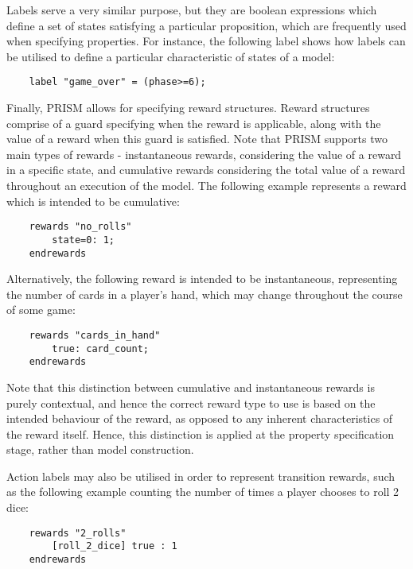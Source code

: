 Labels serve a very similar purpose, but they are boolean expressions which define a set of states satisfying a particular proposition, which are frequently used when specifying properties. For instance, the following label shows how labels can be utilised to define a particular characteristic of states of a model:

\begin{verbatim}
    label "game_over" = (phase>=6);
\end{verbatim}




Finally, PRISM allows for specifying reward structures. Reward structures comprise of a guard specifying when the reward is applicable, along with the value of a reward when this guard is satisfied. Note that PRISM supports two main types of rewards - instantaneous rewards, considering the value of a reward in a specific state, and cumulative rewards considering the total value of a reward throughout an execution of the model.  The following example represents a reward which is intended to be cumulative:

\begin{verbatim}
    rewards "no_rolls"
        state=0: 1;
    endrewards
\end{verbatim}

Alternatively, the following reward is intended to be instantaneous, representing the number of cards in a player's hand, which may change throughout the course of some game:

\begin{verbatim}
    rewards "cards_in_hand"
        true: card_count;
    endrewards
\end{verbatim}

Note that this distinction between cumulative and instantaneous rewards is purely contextual, and hence the correct reward type to use is based on the intended behaviour of the reward, as opposed to any inherent characteristics of the reward itself. Hence, this distinction is applied at the property specification stage, rather than model construction.

Action labels may also be utilised in order to represent transition rewards, such as the following example counting the number of times a player chooses to roll 2 dice:

\begin{verbatim}
    rewards "2_rolls"
        [roll_2_dice] true : 1
    endrewards
\end{verbatim}




